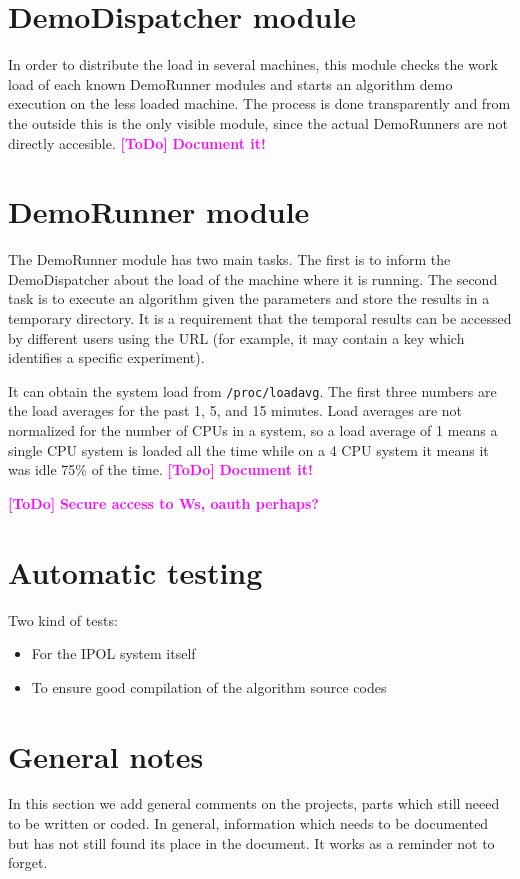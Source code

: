 \documentclass[a4paper,12pt]{article}
\newcommand{\ToDo}[1]{\textcolor{magenta}{\textbf{[ToDo]} \textbf{#1}}}
\begin{document}
\section{DemoDispatcher module}
In order to distribute the load in several machines, this module checks the work load of each known DemoRunner modules and starts an algorithm demo execution on the less loaded machine. The process is done transparently and from the outside this is the only visible module, since the actual DemoRunners are not directly accesible.
\ToDo{Document it!}

\section{DemoRunner module}
The DemoRunner module has two main tasks. The first is to inform the DemoDispatcher about the load of the machine where it is running. The second task is to execute an algorithm given the parameters and store the results in a temporary directory. It is a requirement that the temporal results can be accessed by different users using the URL (for example, it may contain a key which identifies a specific experiment).

It can obtain the system load from {\tt /proc/loadavg}. The first three numbers are the load averages for the past 1, 5, and 15 minutes. Load averages are not normalized for the number of CPUs in a system, so a load  average  of 1 means a single CPU system is loaded all the time while on a 4 CPU system it means it was idle 75\% of the time.
\ToDo{Document it!}





\ToDo{Secure access to Ws, oauth perhaps?}

\section{Automatic testing}
Two kind of tests:
\begin{itemize}
  \item For the IPOL system itself
  \item To ensure good compilation of the algorithm source codes
\end{itemize}

\section{General notes}
In this section we add general comments on the projects, parts which still neeed to be written or coded. In general, information which needs to be documented but has not still found its place in the document. It works as a reminder not to forget.
\end{document}
